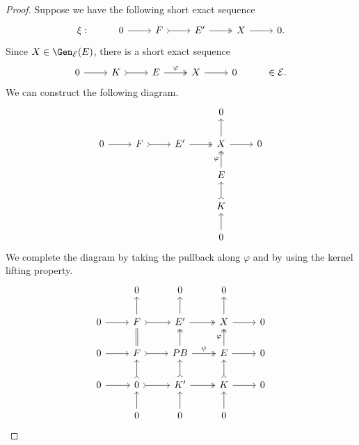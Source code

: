 \begin{proof}
 Suppose we have the following short exact sequence
 \[\begin{tikzcd}
	\xi: & 0 & F & E' & X&  0.
	\arrow[from=1-2, to=1-3]
	\arrow[tail, from=1-3, to=1-4]
	\arrow[two heads,from=1-4, to=1-5]
	\arrow[from=1-5, to=1-6]
\end{tikzcd}\] Since $X \in \Gen_\mathcal{E}(E)$,
there is a short exact sequence \[\begin{tikzcd}
	0 & K & E  & X&  0 & \in \mathcal{E}.
	\arrow[from=1-1, to=1-2]
	\arrow[tail, from=1-2, to=1-3]
	\arrow[two heads,"\varphi",from=1-3, to=1-4]
	\arrow[from=1-4, to=1-5]
\end{tikzcd} \] We can construct the following diagram.
\[\begin{tikzcd}
         & & & 0 &  \\
	0 & F & E'  & X &  0 \\
      & & & E & \\
      & & & K & \\
       & & & 0 & 
	\arrow[from=2-1, to=2-2]
	\arrow[tail, from=2-2, to=2-3]
	\arrow[two heads,from=2-3, to=2-4]
	\arrow[from=2-4, to=2-5]
        \arrow[from=5-4, to=4-4]
	\arrow[tail, from=4-4, to=3-4]
	\arrow[two heads,"\varphi",from=3-4, to=2-4]
	\arrow[from=2-4, to=1-4]
\end{tikzcd} \]
We complete the diagram by taking the pullback along $\varphi$ and by using the kernel lifting property. 
\[\begin{tikzcd}
         & 0 & 0 & 0 &  \\
	0 & F & E'  & X &  0 \\
     0 & F & PB & E & 0 \\
      0 & 0 & K' & K & 0 \\
       & 0 & 0 & 0 & 
	\arrow[from=2-1, to=2-2]
	\arrow[tail, from=2-2, to=2-3]
	\arrow[two heads,from=2-3, to=2-4]
	\arrow[from=2-4, to=2-5]
        \arrow[from=3-1, to=3-2]
	\arrow[tail, from=3-2, to=3-3]
	\arrow[two heads,"\psi",from=3-3, to=3-4]
	\arrow[from=3-4, to=3-5]
        \arrow[from=4-1, to=4-2]
	\arrow[tail, from=4-2, to=4-3]
	\arrow[two heads,from=4-3, to=4-4]
	\arrow[from=4-4, to=4-5]
        \arrow[from=5-2, to=4-2]
	\arrow[tail, from=4-2, to=3-2]
	\arrow[equals,from=3-2, to=2-2]
	\arrow[from=2-2, to=1-2]
        \arrow[from=5-3, to=4-3]
	\arrow[tail, from=4-3, to=3-3]
	\arrow[two heads,from=3-3, to=2-3]
	\arrow[from=2-3, to=1-3]
        \arrow[from=5-4, to=4-4]
	\arrow[tail, from=4-4, to=3-4]
	\arrow[two heads,"\varphi",from=3-4, to=2-4]
	\arrow[from=2-4, to=1-4]
\end{tikzcd} \]


\end{proof}
